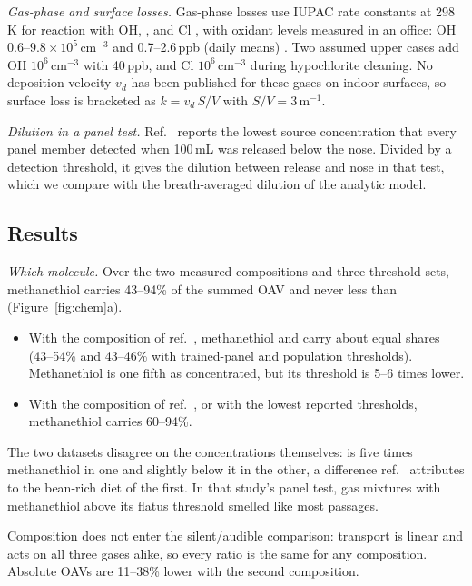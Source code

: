 \documentclass[11pt]{article}
\begin{document}
\emph{Gas-phase and surface losses.} Gas-phase losses use IUPAC rate constants at 298\,K for reaction with OH,
,  and Cl \cite{atkinson2004}, with oxidant levels measured in an office: OH
$0.6$--$9.8\times10^{5}$\,cm$^{-3}$ and  0.7--2.6\,ppb (daily means) \cite{fiorentino2023}. Two assumed upper cases add OH
$10^6$\,cm$^{-3}$ with  40\,ppb, and Cl $10^6$\,cm$^{-3}$ during hypochlorite cleaning. No deposition velocity
$v_d$ has been published for these gases on indoor surfaces, so surface loss is bracketed as $k = v_d\,S/V$ with
$S/V = 3$\,m$^{-1}$.

\emph{Dilution in a panel test.} Ref.~ reports the lowest source concentration that every panel
member detected when 100\,mL was released below the nose. Divided by a detection threshold, it gives the dilution
between release and nose in that test, which we compare with the breath-averaged dilution of the analytic model.

\subsection{Results}
\emph{Which molecule.} Over the two measured compositions and three threshold sets, methanethiol carries 43--94\% of
the summed OAV and never less than  (Figure~\ref{fig:chem}a).
\begin{itemize}
  \item With the composition of ref.~, methanethiol and  carry about equal shares (43--54\%
  and 43--46\% with trained-panel and population thresholds). Methanethiol is one fifth as concentrated, but its
  threshold is 5--6 times lower.
  \item With the composition of ref.~, or with the lowest reported thresholds, methanethiol
  carries 60--94\%.
\end{itemize}
The two datasets disagree on the concentrations themselves:  is five times methanethiol in one and slightly
below it in the other, a difference ref.~ attributes to the bean-rich diet of the first. In
that study's panel test, gas mixtures with methanethiol above its flatus threshold smelled like most passages.

Composition does not enter the silent/audible comparison: transport is linear and acts on all three gases alike, so
every ratio is the same for any composition. Absolute OAVs are 11--38\% lower with the second composition.
\end{document}
